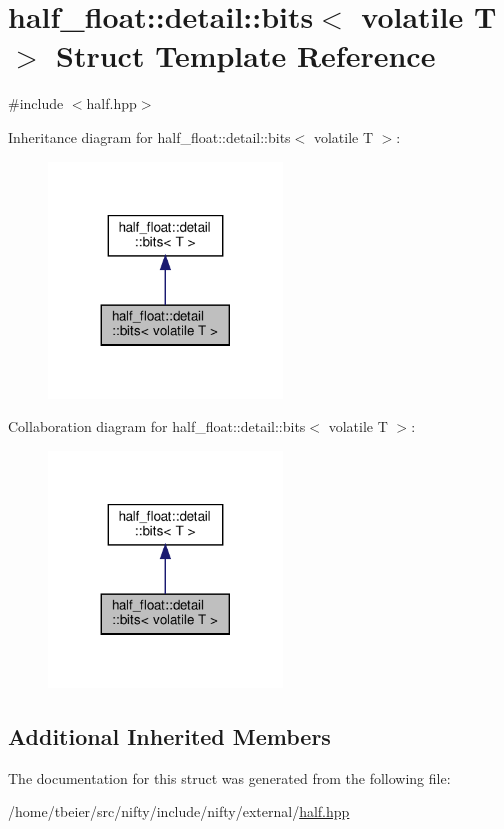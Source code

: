 \hypertarget{structhalf__float_1_1detail_1_1bits_3_01volatile_01T_01_4}{}\section{half\+\_\+float\+:\+:detail\+:\+:bits$<$ volatile T $>$ Struct Template Reference}
\label{structhalf__float_1_1detail_1_1bits_3_01volatile_01T_01_4}


{\ttfamily \#include $<$half.\+hpp$>$}



Inheritance diagram for half\+\_\+float\+:\+:detail\+:\+:bits$<$ volatile T $>$\+:
\nopagebreak
\begin{figure}[H]
\begin{center}
\leavevmode
\includegraphics[width=176pt]{structhalf__float_1_1detail_1_1bits_3_01volatile_01T_01_4__inherit__graph}
\end{center}
\end{figure}


Collaboration diagram for half\+\_\+float\+:\+:detail\+:\+:bits$<$ volatile T $>$\+:
\nopagebreak
\begin{figure}[H]
\begin{center}
\leavevmode
\includegraphics[width=176pt]{structhalf__float_1_1detail_1_1bits_3_01volatile_01T_01_4__coll__graph}
\end{center}
\end{figure}
\subsection*{Additional Inherited Members}


The documentation for this struct was generated from the following file\+:\begin{DoxyCompactItemize}
\item 
/home/tbeier/src/nifty/include/nifty/external/\hyperlink{half_8hpp}{half.\+hpp}\end{DoxyCompactItemize}
